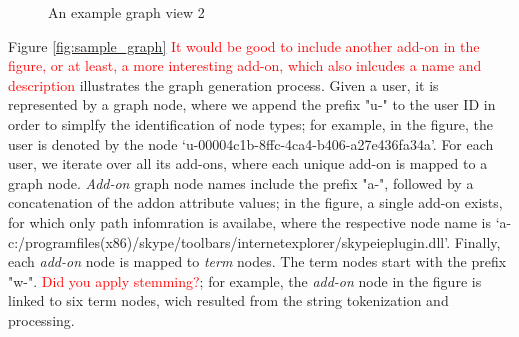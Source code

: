 \documentclass[11pt,oneside]{book}
\begin{document}
  \begin{figure}
    \centering 
    \caption{An example graph view 2}
    \label{fig:sample_graph2}
  \end{figure}
  
Figure \ref{fig:sample_graph} \textcolor{red}{It would be good to include another add-on in the figure, or at least, a more interesting add-on, which also inlcudes a name and description} illustrates the graph generation process. Given a user, it is represented by a graph node, where we append the prefix "u-" to the user ID in order to simplfy the identification of node types; for example, in the figure, the user is denoted by the node `u-00004c1b-8ffc-4ca4-b406-a27e436fa34a'. For each user, we iterate over all its add-ons, where each unique add-on is mapped to a graph node. {\it Add-on} graph node names include the prefix "a-", followed by a concatenation of the addon attribute values; in the figure, a single add-on exists, for which only path infomration is availabe, where the respective node name is `a-c:/programfiles(x86)/skype/toolbars/internetexplorer/skypeieplugin.dll'. Finally, each {\it add-on} node is mapped to {\it term} nodes. The term nodes start with the prefix "w-". \textcolor{red}{Did you apply stemming?}; for example, the {\it add-on} node in the figure is linked to six term nodes, wich resulted from the string tokenization and processing. 
  
\end{document}
